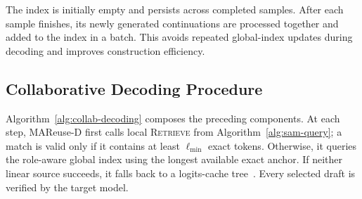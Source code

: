 \documentclass[letterpaper]{article} %
\begin{document}
The index is initially empty and persists across completed samples. After each sample finishes, its newly generated continuations are processed together and added to the index in a batch. This avoids repeated global-index updates during decoding and improves construction efficiency.

\subsection{Collaborative Decoding Procedure}

Algorithm~\ref{alg:collab-decoding} composes the preceding components. At each step, MAReuse-D first calls local \textsc{Retrieve} from Algorithm~\ref{alg:sam-query}; a match is valid only if it contains at least $\ell_{\min}$ exact tokens. Otherwise, it queries the role-aware global index using the longest available exact anchor. If neither linear source succeeds, it falls back to a logits-cache tree~\citep{DBLP:conf/acl/LuoWZZZ0X25}. Every selected draft is verified by the target model.

\end{document}

